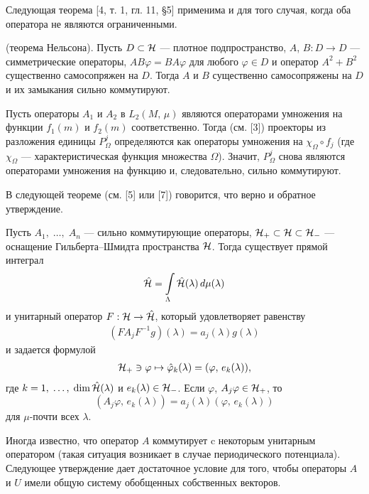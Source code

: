 \documentclass[a4paper
]{article}
\begin{document}
Следующая теорема [4, т. 1, гл. 11, \S 5] применима и для того случая, когда оба
оператора не являются ограниченными.
\begin{Trm}
\label{trm_nelson}
(теорема Нельсона). Пусть $D\subset {\cal H}$
--- плотное подпространство, $A$, $B:D\rightarrow D$ --- симметрические
операторы, $AB\varphi =BA\varphi$ для любого $\varphi\in D$ и оператор
$A^2+B^2$ существенно самосопряжен на $D$. Тогда $A$ и $B$ существенно
самосопряжены на $D$ и их замыкания сильно коммутируют.
\end{Trm}
Пусть операторы $A_1$ и $A_2$ в $L_2(M, \, \mu)$ являются операторами
умножения на функции $f_1(m)$ и $f_2(m)$ соответственно. Тогда (см. [3])
проекторы из разложения единицы $P_{\Omega}^j$ определяются как
операторы умножения на $\chi_{\Omega}\circ f_j$ (где $\chi_{\Omega}$
--- характеристическая функция множества $\Omega$). Значит, $P^j_{\Omega}$
снова являются операторами умножения на функцию и, следовательно,
сильно коммутируют. \par
В следующей теореме (см. [5] или [7]) говорится, что верно и обратное
утверждение.
\begin{Trm}
\label{maurin_trm}
Пусть $A_1, \; \dots, \; A_n$ --- сильно коммутирующие операторы,
${\cal H}_+\subset {\cal H}\subset {\cal H}_-$ --- оснащение
Гильберта--Шмидта пространства ${\cal H}$. Тогда существует прямой интеграл
$$\hat{{\cal H}}=\int \limits _{\Lambda}\hat{{\cal H}}(\lambda)\, d\mu
(\lambda)$$ и унитарный оператор $F:{\cal H}\rightarrow \hat{{\cal H}}$,
который удовлетворяет равенству
\begin{align}
\label{4oper_preobr_furie}
(FA_jF^{-1}g)(\lambda)=a_j(\lambda)g(\lambda)
\end{align}
и задается формулой
\begin{align}
\label{4obob_preobr_furie}
{\cal H}_+\ni \varphi\mapsto \hat{\varphi}_k(\lambda)=(\varphi, \,
e_k(\lambda)),
\end{align}
где $k=1, \; \dots, \; \dim \hat{{\cal H}}(\lambda)$
и $e_k(\lambda)\in {\cal H}_-$. Если $\varphi$, $A_j\varphi\in {\cal H}_+$,
то $$(A_j\varphi, \, e_k(\lambda))=a_j(\lambda)(\varphi, \,
e_k(\lambda))$$ для $\mu$-почти всех $\lambda$.
\end{Trm}
Иногда известно, что оператор $A$ коммутирует c некоторым унитарным
оператором (такая ситуация возникает в случае периодического потенциала).
Следующее утверждение дает достаточное условие для того, чтобы операторы
$A$ и $U$ имели общую систему обобщенных собственных векторов.
\end{document}
